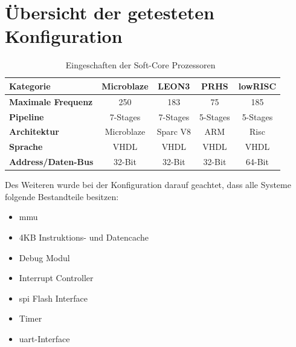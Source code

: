 \newpage
\section{Übersicht der getesteten Konfiguration}\label{kap:getestetekonfiguration}


\begin{table}[H]
\centering
\begin{tabular}{|l|c|c|c|c|}
  \hline
  \textbf{Kategorie} & \textbf{Microblaze} & \textbf{LEON3}& \textbf{PRHS}& \textbf{lowRISC}\\
  \hline
  \textbf{Maximale Frequenz} &250 & 183 & 75 & 185\\
  \hline
  \textbf{Pipeline} & 7-Stages & 7-Stages & 5-Stages & 5-Stages\\
  \hline
  \textbf{Architektur} & Microblaze & Sparc V8  & ARM &  Risc\\
  \hline
  \textbf{Sprache} & VHDL & VHDL & VHDL & VHDL\\
    \hline
  \textbf{Address/Daten-Bus} & 32-Bit & 32-Bit & 32-Bit & 64-Bit\\
      \hline
\end{tabular}
  \caption{Eingeschaften der Soft-Core Prozessoren~\cite{comparison}}
 \label{tab:features}
  \end{table}

Des Weiteren wurde bei der Konfiguration darauf geachtet, dass alle Systeme folgende Bestandteile besitzen:\\
\begin{itemize}
  \item \ac{mmu}
  \item 4KB Instruktions- und Datencache
  \item Debug Modul
  \item Interrupt Controller
  \item \ac{spi} Flash Interface
  \item Timer
  \item \ac{uart}-Interface
\end{itemize}

